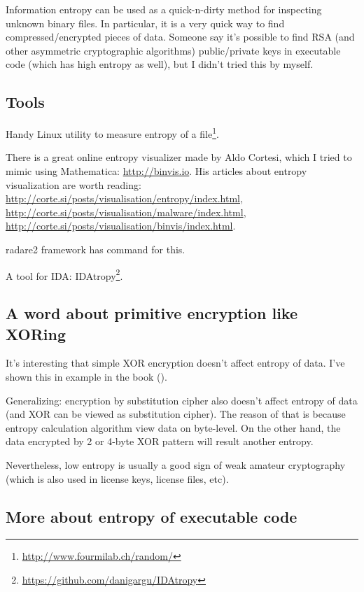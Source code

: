 Information entropy can be used as a quick-n-dirty method for inspecting unknown binary files.
In particular, it is a very quick way to find compressed/encrypted pieces of data.
Someone say it's possible to find RSA (and other asymmetric cryptographic algorithms) public/private keys 
in executable code (which has high entropy as well), but I didn't tried this by myself.

\subsection{Tools}

Handy Linux  utility to measure entropy of a file\footnote{\url{http://www.fourmilab.ch/random/}}.

There is a great online entropy visualizer made by Aldo Cortesi, 
which I tried to mimic using Mathematica: \url{http://binvis.io}.
His articles about entropy visualization are worth reading:
\url{http://corte.si/posts/visualisation/entropy/index.html},
\url{http://corte.si/posts/visualisation/malware/index.html},
\url{http://corte.si/posts/visualisation/binvis/index.html}.

radare2 framework has  command for this.

A tool for IDA: IDAtropy\footnote{\url{https://github.com/danigargu/IDAtropy}}.

\subsection{A word about primitive encryption like XORing}

It's interesting that simple XOR encryption doesn't affect entropy of data.
I've shown this in  example in the book ().

Generalizing: encryption by substitution cipher also doesn't affect entropy of data (and XOR can be viewed as substitution cipher).
The reason of that is because entropy calculation algorithm view data on byte-level.
On the other hand, the data encrypted by 2 or 4-byte XOR pattern will result another entropy.

Nevertheless, low entropy is usually a good sign of weak amateur cryptography
(which is also used in license keys, license files, etc).

\subsection{More about entropy of executable code}

